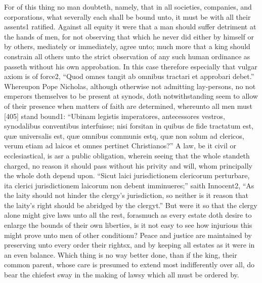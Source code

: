 For of this thing no man doubteth, namely, that in all societies, companies, and corporations, what severally each shall be bound unto, it must be with all their assents1 ratified. Against all equity it were that a man should suffer detriment at the hands of men, for not observing that which he never did either by himself or by others, mediately or immediately, agree unto; much more that a king should constrain all others unto the strict observation of any such human ordinance as passeth without his own approbation. In this case therefore especially that vulgar axiom is of force2, “Quod omnes tangit ab omnibus tractari et approbari debet.” Whereupon Pope Nicholas, although otherwise not admitting lay-persons, no not emperors themselves to be present at synods, doth notwithstanding seem to allow of their presence when matters of faith are determined, whereunto all men must [405] stand bound1: “Ubinam legistis imperatores, antecessores vestros, synodalibus conventibus interfuisse; nisi forsitan in quibus de fide tractatum est, quæ universalis est, quæ omnibus communis estq, quæ non solum ad clericos, verum etiam ad laicos et omnes pertinet Christianos?” A law, be it civil or ecclesiastical, is asr a public obligation, wherein seeing that the whole standeth charged, no reason it should pass without his privity and will, whom principally the whole doth depend upon. “Sicut laici jurisdictionem clericorum perturbare, ita clerici jurisdictionem laicorum non debent imminueres;” saith Innocent2, “As the laity should not hinder the clergy’s jurisdiction, so neither is it reason that the laity’s right should be abridged by the clergyt.” But were it so that the clergy alone might give laws unto all the rest, forasmuch as every estate doth desire to enlarge the bounds of their own liberties, is it not easy to see how injurious this might prove unto men of other conditionu? Peace and justice are maintained by preserving unto every order their rightsx, and by keeping all estates as it were in an even balance. Which thing is no way better done, than if the king, their common parent, whose care is presumed to extend most indifferently over all, do bear the chiefest sway in the making of lawsy which all must be ordered by.


